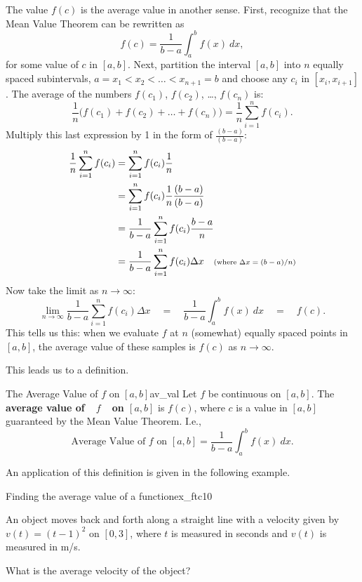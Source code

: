 The value $f(c)$ is the average value in another sense. First, recognize that the Mean Value Theorem can be rewritten as $$f(c) = \frac{1}{b-a}\int_a^b f(x)\ dx,$$ for some value of $c$ in $[a,b]$. Next, partition the interval $[a,b]$ into $n$ equally spaced subintervals, $a=x_1 < x_2 < \ldots < x_{n+1}=b$ and choose any $c_i$ in $[x_i,x_{i+1}]$. The average of the numbers $f(c_1)$, $f(c_2)$, \ldots, $f(c_n)$ is:
	$$\frac1n\Big(f(c_1) + f(c_2) + \ldots + f(c_n)\Big) = \frac1n\sum_{i=1}^n f(c_i).$$ Multiply this last expression by 1 in the form of $\frac{(b-a)}{(b-a)}$:
	\begin{align*}
	\frac1n\sum_{i=1}^n f(c_i) &= \sum_{i=1}^n f(c_i)\frac1n \\
									&= \sum_{i=1}^n f(c_i)\frac1n \frac{(b-a)}{(b-a)} \\
									&= \frac{1}{b-a} \sum_{i=1}^n f(c_i)\frac{b-a}n  \\
									&=\frac{1}{b-a} \sum_{i=1}^n f(c_i)\Delta x\quad \text{\scriptsize (where $\Delta x = (b-a)/n$)} %
	\end{align*}
Now take the limit as $n\to\infty$:
		$$\lim_{n\to\infty} \frac{1}{b-a} \sum_{i=1}^n f(c_i)\Delta x\quad  = \quad \frac{1}{b-a} \int_a^b f(x)\ dx\quad = \quad  f(c).$$
This tells us this: when we evaluate $f$ at $n$ (somewhat) equally spaced points in $[a,b]$, the average value of these samples is $f(c)$ as $n\to\infty$.

This leads us to a definition.

\begin{definition}{The Average Value of $f$ on $[a,b]$}{av_val}
{Let $f$ be continuous on $[a,b]$. The \textbf{average value of\ \ $f$\ \ on $[a,b]$} is $f(c)$, where $c$ is a value in $[a,b]$ guaranteed by the Mean Value Theorem. I.e., 
$$\text{Average Value of $f$ on $[a,b]$} = \frac{1}{b-a}\int_a^b f(x)\ dx.$$
}
\end{definition}


An application of this definition is given in the following example.\\

\begin{example}{Finding the average value of a function}{ex_ftc10}
{
An object moves back and forth along a straight line with a velocity given by $v(t) = (t-1)^2$ on $[0,3]$, where $t$ is measured in seconds and $v(t)$ is measured in m/s. 

What is the average velocity of the object?
}
\end{example}

